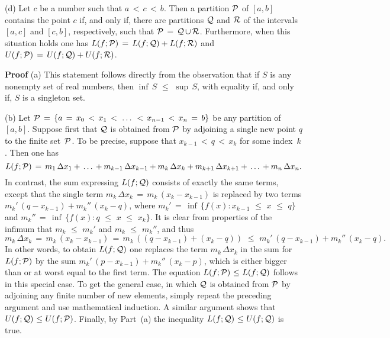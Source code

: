 \V

        (d) Let $c$ be a number such that $a\,<\,c\,<\,b$. Then a partition ${\cal P}$ of $[a,b]$ contains the point $c$ if, and only if,
    there are partitions ${\cal Q}$ and ${\cal R}$ of the intervals $[a,c]$ and $[c,b]$, respectively, such that ${\cal P} \,=\, {\cal Q}\,{\cup}\,{\cal R}$.
    Furthermore, when this situation holds one has $L(f;{\cal P}) \,=\, L(f;{\cal Q}) + L(f;{\cal R})$ and
    $U(f;{\cal P}) \,=\, U(f;{\cal Q}) + U(f;{\cal R})$.


\V

        {\bf Proof} (a) This statement follows directly from the observation that if $S$ is any nonempty set of real numbers, then ${\inf}\,S\,\,{\leq}\,\,{\sup}\,S$, with equality if, and only if, $S$ is a singleton set.

\V

        (b) Let ${\cal P} \,=\, \{a \,=\, x_{0}\,<\,x_{1}\,<\,\,{\ldots}\,\,<\,x_{n-1}\,<\,x_{n} \,=\, b\}$ be any partition of~$[a,b]$.
    Suppose first that ${\cal Q}$ is obtained from ${\cal P}$ by adjoining a single new point $q$ to the finite set~${\cal P}$.
    To be precise, suppose that $x_{k-1}\,<\,q\,<\,x_{k}$ for some index~$k$. Then one has
        \begin{displaymath}
        L(f;{\cal P}) \,=\, m_{1}\,{\Delta}x_{1} + \,{\ldots}\, + m_{k-1}\,{\Delta}x_{k-1} + m_{k}\,{\Delta}x_{k} + m_{k+1}\,{\Delta}x_{k+1} + \,{\ldots}\, + m_{n}\,{\Delta}x_{n}.
        \end{displaymath}
    In contrast, the sum expressing $L(f;{\cal Q})$ consists of exactly the same terms,
    except that the single term $m_{k}\,{\Delta}x_{k} \,=\, m_{k}\,(x_{k}-x_{k-1})$ is replaced by two terms $m_{k}'\,(q-x_{k-1}) + m_{k}''\,(x_{k}-q)$,
    where $m_{k}' \,=\, {\inf}\,\{f(x): x_{k-1}\,\,{\leq}\,\,x\,\,{\leq}\,\,q\}$ and $m_{k}'' \,=\, {\inf}\,\{f(x): q\,\,{\leq}\,\,x\,\,{\leq}\,\,x_{k}\}$.
    It is clear from properties of the infimum that $m_{k}\,\,{\leq}\,\,m_{k}'$ and $m_{k}\,\,{\leq}\,\,m_{k}''$, and thus
        \begin{displaymath}
        m_{k}\,{\Delta}x_{k} \,=\, m_{k}\,(x_{k}-x_{k-1})
     \,=\, 
        m_{k}\,((q-x_{k-1}) + (x_{k}-q))\,\,{\leq}\,\,
        m_{k}'\,(q-x_{k-1}) + m_{k}''\,(x_{k}-q).
        \end{displaymath}
    In other words, to obtain $L(f;{\cal Q})$ one replaces the term $m_{k}\,{\Delta}x_{k}$ in the sum for $L(f;{\cal P})$
    by the sum $m_{k}'\,(p-x_{k-1}) + m_{k}''\,(x_{k}-p)$, which is either bigger than or at worst equal to the first term. The equation $L(f;{\cal P})\,\,{\leq}\,\,L(f;{\cal Q})$ follows in this special case.
    To get the general case, in which ${\cal Q}$ is obtained from ${\cal P}$ by adjoining any finite number of new elements,
    simply repeat the preceding argument and use mathematical induction. A similar argument shows that $U(f;{\cal Q})\,\,{\leq}\,\,U(f;{\cal P})$.
    Finally, by Part~(a) the inequality $L(f;{\cal Q})\,\,{\leq}\,\,U(f;{\cal Q})$ is true.

